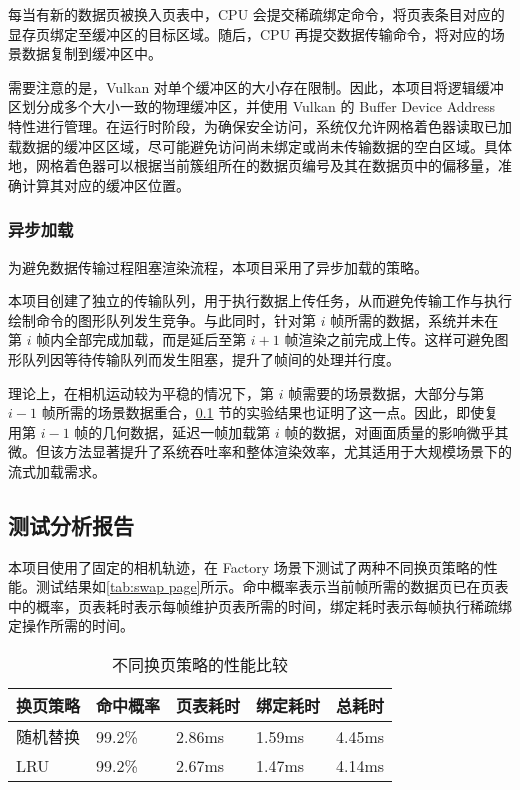 每当有新的数据页被换入页表中，CPU 会提交稀疏绑定命令，将页表条目对应的显存页绑定至缓冲区的目标区域。随后，CPU 再提交数据传输命令，将对应的场景数据复制到缓冲区中。

需要注意的是，Vulkan 对单个缓冲区的大小存在限制。因此，本项目将逻辑缓冲区划分成多个大小一致的物理缓冲区，并使用 Vulkan 的 Buffer Device Address 特性进行管理\cite{BDA}。在运行时阶段，为确保安全访问，系统仅允许网格着色器读取已加载数据的缓冲区区域，尽可能避免访问尚未绑定或尚未传输数据的空白区域。具体地，网格着色器可以根据当前簇组所在的数据页编号及其在数据页中的偏移量，准确计算其对应的缓冲区位置。

\subsubsection{异步加载}

为避免数据传输过程阻塞渲染流程，本项目采用了异步加载的策略\cite{UnityStreaming}。

本项目创建了独立的传输队列，用于执行数据上传任务，从而避免传输工作与执行绘制命令的图形队列发生竞争。与此同时，针对第 $i$ 帧所需的数据，系统并未在第 $i$ 帧内全部完成加载，而是延后至第 $i{+}1$ 帧渲染之前完成上传。这样可避免图形队列因等待传输队列而发生阻塞，提升了帧间的处理并行度。

理论上，在相机运动较为平稳的情况下，第 $i$ 帧需要的场景数据，大部分与第 $i{-}1$ 帧所需的场景数据重合，\ref{subsec:streaming test} 节的实验结果也证明了这一点。因此，即使复用第 $i{-}1$ 帧的几何数据，延迟一帧加载第 $i$ 帧的数据，对画面质量的影响微乎其微。但该方法显著提升了系统吞吐率和整体渲染效率，尤其适用于大规模场景下的流式加载需求。

\subsection{测试分析报告} \label{subsec:streaming test}

本项目使用了固定的相机轨迹，在 Factory 场景下测试了两种不同换页策略的性能。测试结果如\autoref{tab:swap page}所示。命中概率表示当前帧所需的数据页已在页表中的概率，页表耗时表示每帧维护页表所需的时间，绑定耗时表示每帧执行稀疏绑定操作所需的时间。

\begin{table}[H]
    \caption{\label{tab:swap page}不同换页策略的性能比较}
    \begin{tabularx}{\linewidth}{|X<{\centering}|X<{\centering}|X<{\centering}|X<{\centering}|X<{\centering}|}
        \hline
        换页策略 & 命中概率 & 页表耗时 & 绑定耗时 & 总耗时 \\ \hline
        随机替换 & 99.2\% & 2.86ms & 1.59ms & 4.45ms \\ \hline
        LRU & 99.2\% & 2.67ms & 1.47ms & 4.14ms \\ \hline
    \end{tabularx}
\end{table}

